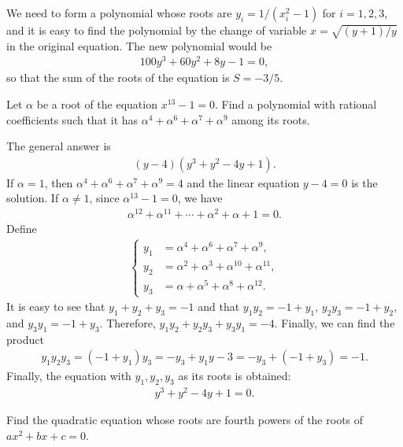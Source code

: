 \documentclass[12pt,a4paper]{memoir}
\theoremstyle{definition}
\begin{document}
\begin{solution}
	We need to form a polynomial whose roots are $y_i=1/(x_i^2-1)$ for $i=1,2,3$, and it is easy to find the polynomial by the change of variable $x=\sqrt{(y+1)/y}$ in the original equation. The new polynomial would be
	\begin{align*}
		100y^3 + 60y^2 + 8y - 1 =0,
	\end{align*}
	so that the sum of the roots of the equation is $S=-3/5$.
\end{solution}

\begin{question}
	Let $\alpha$ be a root of the equation $x^{13}-1=0$. Find a polynomial with rational coefficients such that it has $\alpha^4 + \alpha^6 + \alpha^7 + \alpha^9$ among its roots.
\end{question}

\begin{solution}
	The general answer is 
	\begin{align*}
		(y-4)(y^3+y^2-4y+1).
	\end{align*}
	If $\alpha=1$, then $\alpha^4 + \alpha^6 + \alpha^7 + \alpha^9=4$ and the linear equation $y-4=0$ is the solution. If $\alpha \neq 1$, since $\alpha^{13}-1=0$, we have
	\begin{align*}
		\alpha^{12} + \alpha^{11} + \cdots + \alpha^2 + \alpha + 1 = 0.
	\end{align*}
	Define
	\begin{align*}
		\begin{cases}
			y_1 &= \alpha^4 + \alpha^6 + \alpha^7 + \alpha^9,\\
			y_2 &= \alpha^2 + \alpha^3 + \alpha^{10} + \alpha^{11},\\
			y_3 &= \alpha + \alpha^5 + \alpha^8 + \alpha^{12}.
		\end{cases}
	\end{align*}
	It is easy to see that $y_1+y_2+y_3=-1$ and that $y_1y_2=-1+y_1$, $y_2y_3=-1+y_2$, and $y_3y_1=-1+y_3$. Therefore, $y_1y_2+y_2y_3+y_3y_1=-4$. Finally, we can find the product
	\begin{align*}
		y_1y_2y_3=(-1+y_1)y_3=-y_3+y_1y-3 = -y_3 + (-1+y_3) = -1.
	\end{align*}
	Finally, the equation with $y_1,y_2,y_3$ as its roots is obtained:
	\begin{align*}
		y^3+y^2-4y+1=0.
	\end{align*}
\end{solution}

\begin{question}
	Find the quadratic equation whose roots are fourth powers of the roots of $ax^2+bx+c=0$.
\end{question}
\end{document}
